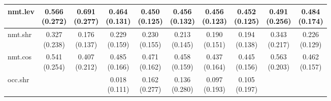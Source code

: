 \documentclass[epsfig,a4paper,11pt,titlepage,twoside,openany]{book}
\begin{document}
\begin{table}[h]
\begin{tabular}{l|c|c|c|c|c|c|c|c|c|}
\multicolumn{1}{|l|}{nmt.lev}            & \makecell{0.566 \\ (0.272)}  & \makecell{0.691 \\ (0.277)} & \makecell{0.464 \\ (0.131)} & \makecell{0.450 \\ (0.125)} & \makecell{0.456 \\ (0.132)} & \makecell{0.456 \\ (0.123)} & \makecell{0.452 \\ (0.125)} & \makecell{0.491 \\ (0.256)}    & \makecell{0.484 \\ (0.174)}   \\ \hline
\multicolumn{1}{|l|}{nmt.shr}                 & \makecell{0.327 \\ (0.238)}  & \makecell{0.176 \\ (0.137)} & \makecell{0.229 \\ (0.159)} & \makecell{0.230 \\ (0.155)} & \makecell{0.213 \\ (0.145)} & \makecell{0.190 \\ (0.151)} & \makecell{0.194 \\ (0.138)} & \makecell{0.343 \\ (0.217)}    & \makecell{0.226 \\ (0.129)}   \\ \hline
\multicolumn{1}{|l|}{nmt.cos} & \makecell{0.541 \\ (0.254)}  & \makecell{0.407 \\ (0.212)} & \makecell{0.485 \\ (0.166)} & \makecell{0.471 \\ (0.162)} & \makecell{0.458 \\ (0.159)} & \makecell{0.437 \\ (0.164)} & \makecell{0.445 \\ (0.156)} & \makecell{0.563 \\ (0.203)}    & \makecell{0.462 \\ (0.157)}   \\ \hline
\multicolumn{1}{|l|}{occ.shr}                  &               &              & \makecell{0.018 \\ (0.111)} & \makecell{0.162 \\ (0.277)} & \makecell{0.136 \\ (0.280)} & \makecell{0.097 \\ (0.193)} & \makecell{0.105 \\ (0.197)} &                 &                \\ \hline

\end{tabular}
\end{table}
\end{document}
